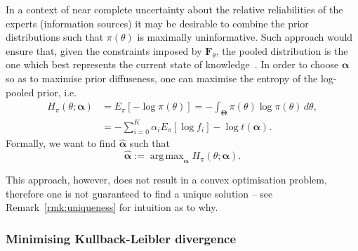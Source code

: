 \documentclass[a4paper, notitlepage, 10pt]{article}
\DeclareMathOperator*{\argmax}{arg\,max}
\begin{document}
In a context of near complete uncertainty about the relative reliabilities of the experts (information sources) it may be desirable to combine the prior distributions such that $\pi(\theta)$ is maximally uninformative. %
Such approach would ensure that, given the constraints imposed by $\mathbf{F}_{\theta}$, the pooled distribution is the one which best represents the current state of knowledge~\citep{Jaynes1957,Savchuk1994}.
In order to choose $\boldsymbol\alpha$ so as to maximise prior 
diffuseness, one can maximise the entropy of the log-pooled prior, i.e.
\begin{align}
\nonumber
H_{\pi}(\theta; \boldsymbol\alpha) &= E_{\pi}\left[-\log \pi(\theta) \right] =-\int_{\boldsymbol\Theta}\pi(\theta)\log\pi(\theta)\, d\theta,\\
\label{eq:entropypiB}
&= -\sum_{i=0}^{K} \alpha_i E_{\pi}[\log f_i] - \log t(\boldsymbol\alpha).
\end{align}
Formally, we want to find $\hat{\boldsymbol\alpha}$ such that
\begin{equation}
\label{eq:argmaxEnt}
 \hat{\boldsymbol\alpha}:= \argmax_{\boldsymbol\alpha} H_{\pi}(\theta; \boldsymbol\alpha).
\end{equation}

This approach, however, does not result in a convex optimisation problem, therefore one is not guaranteed to find a unique solution -- see Remark~\ref{rmk:uniqueness} for intuition as to why.

\subsubsection{Minimising Kullback-Leibler divergence}
\label{sec:minKL}
\end{document}
